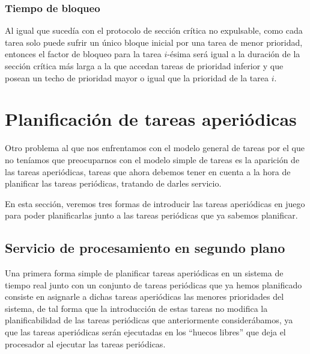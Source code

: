 \subsubsection{Tiempo de bloqueo}
Al igual que sucedía con el protocolo de sección crítica no expulsable, como cada tarea solo puede sufrir un único bloque inicial por una tarea de menor prioridad, entonces el factor de bloqueo para la tarea $i$-ésima será igual a la duración de la sección crítica más larga a la que accedan tareas de prioridad inferior y que posean un techo de prioridad mayor o igual que la prioridad de la tarea $i$.

\section{Planificación de tareas aperiódicas}
Otro problema al que nos enfrentamos con el modelo general de tareas por el que no teníamos que preocuparnos con el modelo simple de tareas es la aparición de las tareas aperiódicas, tareas que ahora debemos tener en cuenta a la hora de planificar las tareas periódicas, tratando de darles servicio.

En esta sección, veremos tres formas de introducir las tareas aperiódicas en juego para poder planificarlas junto a las tareas periódicas que ya sabemos planificar.

\subsection{Servicio de procesamiento en segundo plano}
Una primera forma simple de planificar tareas aperiódicas en un sistema de tiempo real junto con un conjunto de tareas periódicas que ya hemos planificado consiste en asignarle a dichas tareas aperiódicas las menores prioridades del sistema, de tal forma que la introducción de estas tareas no modifica la planificabilidad de las tareas periódicas que anteriormente considerábamos, ya que las tareas aperiódicas serán ejecutadas en los ``huecos libres'' que deja el procesador al ejecutar las tareas periódicas.

